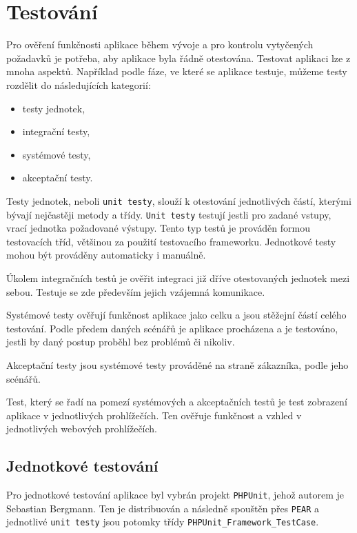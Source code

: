 \documentclass[thesis=B,czech]{FITthesis}[2012/04/27]
\begin{document}
\chapter{Testování}
Pro ověření funkčnosti aplikace během vývoje a pro kontrolu vytyčených požadavků je potřeba, aby aplikace byla řádně otestována. Testovat aplikaci lze z mnoha aspektů. Například podle fáze, ve které se aplikace testuje, můžeme testy rozdělit do následujících kategorií:

\begin{itemize}
	\item testy jednotek,
	\item integrační testy,
	\item systémové testy,
	\item akceptační testy.
\end{itemize}

Testy jednotek, neboli \texttt{unit testy}, slouží k otestování jednotlivých částí, kterými bývají nejčastěji metody a třídy. \texttt{Unit testy} testují jestli pro zadané vstupy, vrací jednotka požadované výstupy. Tento typ testů je prováděn formou testovacích tříd, většinou za použití testovacího frameworku. Jednotkové testy mohou být prováděny automaticky i manuálně.

Úkolem integračních testů je ověřit integraci již dříve otestovaných jednotek mezi sebou. Testuje se zde především jejich vzájemná komunikace.    

Systémové testy ověřují funkčnost aplikace jako celku a jsou stěžejní částí celého testování. Podle předem daných scénářů je aplikace procházena a je testováno, jestli by daný postup proběhl bez problémů či nikoliv. 

Akceptační testy jsou systémové testy prováděné na straně zákazníka, podle jeho scénářů.

Test, který se řadí na pomezí systémových a akceptačních testů je test zobrazení aplikace v jednotlivých prohlížečích. Ten ověřuje funkčnost a vzhled v jednotlivých webových prohlížečích. 

\section{Jednotkové testování}
Pro jednotkové testování aplikace byl vybrán projekt \texttt{PHPUnit}, jehož autorem je Sebastian Bergmann\cite{phpunit}. Ten je distribuován a následně spouštěn přes \texttt{PEAR} a jednotlivé \texttt{unit testy} jsou potomky třídy \texttt{PHPUnit\-\_Framework\_TestCase}.
\end{document}

